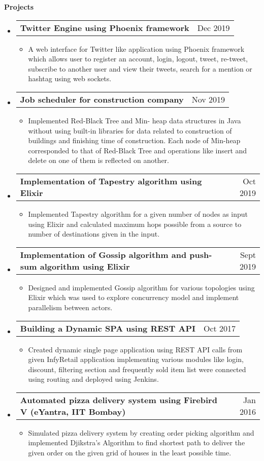 \documentclass[letterpaper,12pt]{article}[leftmargin=*]
\makeatletter
\def \entryspacing {-2pt}
\def \entryspacingnew {-4pt}
\renewcommand{\section}[2]{\vspace{5pt}
  \colorbox{secondary}{\color{white}\raggedbottom\normalsize\textbf{{#1}{\hspace{7pt}#2}}}
}
\newcommand{\resumeEntryStart}{\begin{itemize}[leftmargin=2.5mm]\vspace{\entryspacingnew}}
\newcommand{\resumeEntryEnd}{\end{itemize}\vspace{\entryspacingnew}}
\newcommand{\resumeItemListStart}{\begin{itemize}[leftmargin=4.5mm]}
\newcommand{\resumeItemListEnd}{\end{itemize}\vspace{\entryspacing}}
\newcommand{\resumeItem}[1]{
  \item\small{
    {#1 \vspace{-2pt}}
  }
}
\newcommand{\resumeEntryTD}[2]{
  \vspace{-1pt}\item[]
    \begin{tabular*}{0.97\textwidth}{l@{\extracolsep{\fill}}r}
      \textbf{\color{primary}#1} & {\firabook\color{accent}\small#2} \\
    \end{tabular*}\vspace{-10pt}
}
\makeatother
\begin{document}
\vspace{3pt}
\hspace{-15pt}\section{\faFlask}{Projects}

  \resumeEntryStart
    \resumeEntryTD
      {Twitter Engine using Phoenix framework}{Dec 2019}
    \resumeItemListStart
      \resumeItem {A web interface for Twitter like application using Phoenix framework which allows user to register an account, login, logout, tweet, re-tweet, subscribe to another user and view their tweets, search for a mention or hashtag using web sockets.}
    \resumeItemListEnd
  \resumeEntryEnd
  \vspace{-3pt}
  \resumeEntryStart
   \resumeEntryTD
      {Job scheduler for construction company}{Nov 2019}
    \resumeItemListStart
      \resumeItem {Implemented Red-Black Tree and Min- heap data structures in Java without using built-in libraries for data related to construction of buildings and finishing time of construction. Each node of Min-heap corresponded to that of Red-Black Tree and operations like insert and delete on one of them is reflected on another.}
    \resumeItemListEnd
  \resumeEntryEnd

  \resumeEntryStart
    \resumeEntryTD
      {Implementation of Tapestry algorithm using Elixir}{Oct 2019}
    \resumeItemListStart
      \resumeItem {Implemented Tapestry algorithm for a given number of nodes as input using Elixir and calculated maximum hops possible from a source to number of destinations given in the input.}
    \resumeItemListEnd
  \resumeEntryEnd

  \resumeEntryStart
    \resumeEntryTD
      {Implementation of Gossip algorithm and push-sum algorithm using Elixir}{Sept 2019}
    \resumeItemListStart
      \resumeItem {Designed and implemented Gossip algorithm for various topologies using Elixir which was used to explore concurrency model and implement parallelism between actors. }
    \resumeItemListEnd
  \resumeEntryEnd
   \resumeEntryStart
    \resumeEntryTD
      {Building a Dynamic SPA using REST API}{Oct 2017}
    \resumeItemListStart
      \resumeItem {Created dynamic single page application using REST API calls from given InfyRetail application implementing various modules like login, discount, filtering section and frequently sold item list were connected using routing and deployed using Jenkins.}
    \resumeItemListEnd
  \resumeEntryEnd
   \resumeEntryStart
    \resumeEntryTD
      {Automated pizza delivery system using Firebird V (eYantra, IIT Bombay)}{Jan 2016}
    \resumeItemListStart
      \resumeItem {Simulated pizza delivery system by creating order picking algorithm and implemented Djikstra’s Algorithm to find shortest path to deliver the given order on the given grid of houses in the least possible time.}
    \resumeItemListEnd
  \resumeEntryEnd
  
\end{document}
